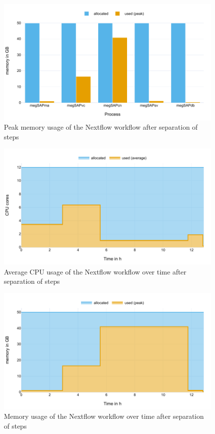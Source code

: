 \begin{figure}[H]
    \centering
	\includegraphics[width=\linewidth,height=\textheight,keepaspectratio]{pipeline_benchmark_memory_v03}
	\caption{Peak memory usage of the Nextflow workflow after separation of steps}
	\label{figure:pipeline_benchmark_memory_v03}
\end{figure}

\begin{figure}[H]
    \centering
	\includegraphics[width=\linewidth,height=\textheight,keepaspectratio]{pipeline_benchmark_CPU_v3_aoc}
	\caption{Average CPU usage of the Nextflow workflow over time after separation of steps}
	\label{figure:pipeline_benchmark_CPU_aoc_v03}
\end{figure}

\begin{figure}[H]
    \centering
	\includegraphics[width=\linewidth,height=\textheight,keepaspectratio]{pipeline_benchmark_memory_v3_aoc}
	\caption{Memory usage of the Nextflow workflow over time after separation of steps}
	\label{figure:pipeline_benchmark_memory_aoc_v03}
\end{figure}

